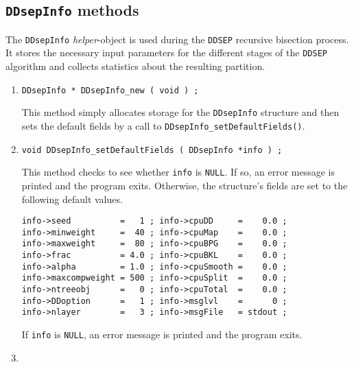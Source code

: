 \subsection{{\tt DDsepInfo} methods}
\label{subsection:GPart:proto:DDsepInfo}
\par
The {\tt DDsepInfo} {\it helper}-object is used during the
{\tt DDSEP} recursive bisection process.
It stores the necessary input parameters for the different stages
of the {\tt DDSEP} algorithm and collects statistics about the
resulting partition.
\par
\begin{enumerate}
\item
\begin{verbatim}
DDsepInfo * DDsepInfo_new ( void ) ;
\end{verbatim}
This method simply allocates storage for the {\tt DDsepInfo} structure 
and then sets the default fields by a call to 
{\tt DDsepInfo\_setDefaultFields()}.
\item
\begin{verbatim}
void DDsepInfo_setDefaultFields ( DDsepInfo *info ) ;
\end{verbatim}
This method checks to see whether {\tt info} is {\tt NULL}.
If so, an error message is printed and the program exits.
Otherwise, the structure's fields are set to the following 
default values.
\begin{verbatim}
info->seed          =   1 ; info->cpuDD     =    0.0 ;
info->minweight     =  40 ; info->cpuMap    =    0.0 ;
info->maxweight     =  80 ; info->cpuBPG    =    0.0 ;
info->frac          = 4.0 ; info->cpuBKL    =    0.0 ;
info->alpha         = 1.0 ; info->cpuSmooth =    0.0 ;
info->maxcompweight = 500 ; info->cpuSplit  =    0.0 ;
info->ntreeobj      =   0 ; info->cpuTotal  =    0.0 ;
info->DDoption      =   1 ; info->msglvl    =      0 ;
info->nlayer        =   3 ; info->msgFile   = stdout ;
\end{verbatim}
\par {}
If {\tt info} is {\tt NULL},
an error message is printed and the program exits.
\item

\end{enumerate}
